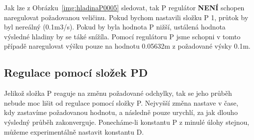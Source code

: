 \documentclass{article}
\begin{document}
	
	\indent Jak lze z Obrázku~\ref{img:hladinaP0005} sledovat, tak P regulátor \textbf{NENÍ} schopen naregulovat požadovanou veličinu. Pokud bychom nastavili složku P 1, průtok by byl nereálný (0.1m3/s). Pokud by byla hodnota P nižší, ustálená hodnota výsledné hladiny by se táké snížíla. Pomocí regulátoru P jsme schopni v tomto případě naregulovat výšku pouze na hodnotu 0.05632m z požadované výsky 0.1m. 
	

\subsection{Regulace pomocí složek PD}

	\indent Jelikož složka P reaguje na změnu požadované odchylky, tak se jeho průběh nebude moc lišit od regulace pomocí složky P. Nejvyšší změna nastave v čase, kdy zastavíme požadovanou hodnotu, a následně pouze urychlí, za jak dlouho výsledný průběh zakonverguje. Ponecháme-li konstantu P z minulé úlohy stejnou, můžeme experimentálně nastavit konstantu D.	
	
\end{document}

